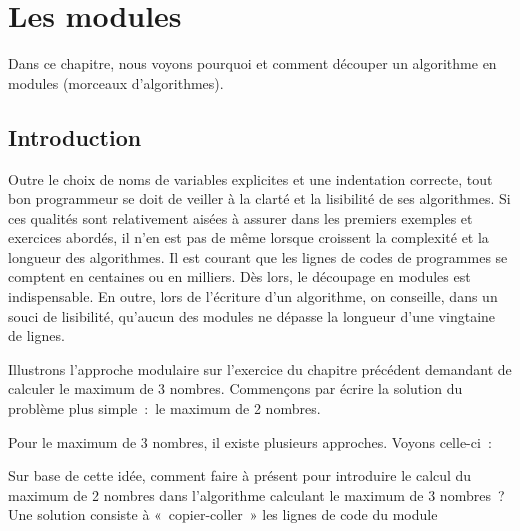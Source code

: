 \chapter{Les modules}

	Dans ce chapitre, nous voyons pourquoi et comment découper un algorithme
	en modules (morceaux d’algorithmes).

\section{Introduction}

	Outre le choix de noms de variables explicites et une indentation
	correcte, tout bon programmeur se doit de veiller à la clarté et la
	lisibilité de ses algorithmes. Si ces qualités sont relativement aisées
	à assurer dans les premiers exemples et exercices abordés, il n’en est
	pas de même lorsque croissent la complexité et la longueur des
	algorithmes. Il est courant que les lignes de codes de programmes se
	comptent en centaines ou en milliers. Dès lors, le découpage en modules
	est indispensable. En outre, lors de l’écriture d’un algorithme, on 
	conseille, dans un souci de lisibilité, qu’aucun des modules
	ne dépasse la longueur d’une vingtaine de lignes.
	
	Illustrons l’approche modulaire sur l’exercice du chapitre précédent
	demandant de calculer le maximum de 3 nombres. Commençons par écrire la
	solution du problème plus simple~:~le maximum de 2 nombres.

	
	Pour le maximum de 3 nombres, il existe plusieurs approches. Voyons
	celle-ci~:


	{Sur base de cette idée, comment faire à présent
	pour introduire le calcul du maximum de 2 nombres dans l’algorithme
	calculant le maximum de 3 nombres~? Une solution consiste à
	«~copier-coller~» les lignes de code du module
	}

